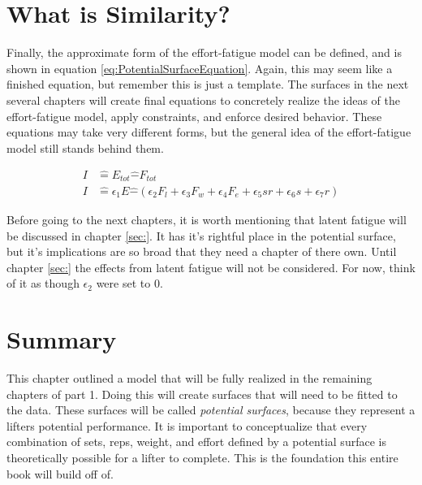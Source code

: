 \section{What is Similarity?}
\label{sec:P2C1_WhatIsSimilarity}



Finally, the approximate form of the effort-fatigue model can be defined, and is shown in equation \ref{eq:PotentialSurfaceEquation}. Again, this may seem like a finished equation, but remember this is just a template. The surfaces in the next several chapters will create final equations to concretely realize the ideas of the effort-fatigue model, apply constraints, and enforce desired behavior. These equations may take very different forms, but the general idea of the effort-fatigue model still stands behind them.

\begin{equation}
	\label{eq:PotentialSurfaceEquation}
	\begin{split}
		I & \hat{=} E_{tot}\hat{-}F_{tot} \\
		I & \hat{=} \epsilon_1 E\hat{-}\left( 
			\epsilon_2 F_l+\epsilon_3 F_w+\epsilon_4 F_e+\epsilon_5 sr+\epsilon_6 s+\epsilon_7 r
		\right)
	\end{split}
\end{equation}

Before going to the next chapters, it is worth mentioning that latent fatigue will be discussed in chapter \ref{sec:}. It has it's rightful place in the potential surface, but it's implications are so broad that they need a chapter of there own. Until chapter \ref{sec:} the effects from latent fatigue will not be considered. For now, think of it as though $\epsilon_2$ were set to $0$. 




\section{Summary}

This chapter outlined a model that will be fully realized in the remaining chapters of part 1. Doing this will create surfaces that will need to be fitted to the data. These surfaces will be called \textit{potential surfaces}, because they represent a lifters potential performance. It is important to conceptualize that every combination of sets, reps, weight, and effort defined by a potential surface is theoretically possible for a lifter to complete. This is the foundation this entire book will build off of.





